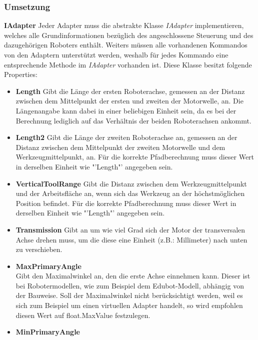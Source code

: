 \subsubsection{Umsetzung}
\textbf{IAdapter}
\newline
Jeder Adapter muss die abstrakte Klasse \textit{IAdapter} implementieren, welches alle Grundinformationen bezüglich des angeschlossene Steuerung und des dazugehörigen Roboters enthält. Weiters müssen alle vorhandenen Kommandos von den Adaptern unterstützt werden, weshalb für jedes Kommando eine entsprechende Methode im \textit{IAdapter} vorhanden ist. Diese Klasse besitzt folgende Properties:
\begin{itemize}
\item \textbf{Length}
\newline
Gibt die Länge der ersten Roboterachse, gemessen an der Distanz zwischen dem Mittelpunkt der ersten und zweiten der Motorwelle, an. Die Längenangabe kann dabei in einer beliebigen Einheit sein, da es bei der Berechnung lediglich auf das Verhältnis der beiden Roboterachsen ankommt.
\item \textbf{Length2}
\newline
Gibt die Länge der zweiten Roboterachse an, gemessen an der Distanz zwischen dem Mittelpunkt der zweiten Motorwelle und dem Werkzeugmittelpunkt, an. Für die korrekte Pfadberechnung muss dieser Wert in derselben Einheit wie "'Length"' angegeben sein.
\item \textbf{VerticalToolRange}
\newline
Gibt die Distanz zwischen dem Werkzeugmittelpunkt und der Arbeitsfläche an, wenn sich das Werkzeug an der höchstmöglichen Position befindet. Für die korrekte Pfadberechnung muss dieser Wert in derselben Einheit wie "'Length"' angegeben sein.
\item \textbf{Transmission}
\newline
Gibt an um wie viel Grad sich der Motor der transversalen Achse drehen muss, um die diese eine Einheit (z.B.: Millimeter) nach unten zu verschieben.
\item \textbf{MaxPrimaryAngle}\\
Gibt den Maximalwinkel an, den die erste Achse einnehmen kann. Dieser ist bei Robotermodellen, wie zum Beispiel dem Edubot-Modell, abhängig von der Bauweise. Soll der Maximalwinkel nicht berücksichtigt werden, weil es sich zum Beispiel um einen virtuellen Adapter handelt, so wird empfohlen diesen Wert auf float.MaxValue festzulegen.
\item \textbf{MinPrimaryAngle}\\

\end{itemize}
